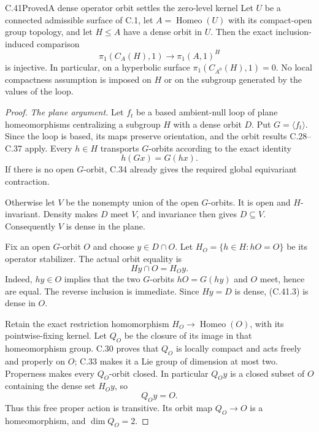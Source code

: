 \begin{claim}{C.41}{Proved}{A dense operator orbit settles the zero-level kernel}
Let $U$ be a connected admissible surface of C.1, let
$A=\operatorname{Homeo}(U)$ with its compact-open group
topology, and let $H\leq A$ have a dense orbit in $U$.
Then the exact inclusion-induced comparison
\[
 \pi_1(C_A(H),1)\longrightarrow\pi_1(A,1)^H
                                                        \tag{C.41.1}
\]
is injective. In particular, on a hyperbolic surface
$\pi_1(C_{A^0}(H),1)=0$. No local compactness assumption
is imposed on $H$ or on the subgroup generated by
the values of the loop.
\end{claim}

\begin{proof}
\emph{The plane argument.}
Let $f_t$ be a based ambient-null loop of plane
homeomorphisms centralizing a subgroup $H$ with
a dense orbit $D$. Put $G=\langle f_t\rangle$.
Since the loop is based, its maps preserve
orientation, and the orbit results C.28--C.37
apply. Every $h\in H$ transports $G$-orbits
according to the exact identity
\[
                       h(Gx)=G(hx).
                                                        \tag{C.41.2}
\]
If there is no open $G$-orbit, C.34 already
gives the required global equivariant contraction.

Otherwise let $V$ be the nonempty union of the
open $G$-orbits. It is open and $H$-invariant.
Density makes $D$ meet $V$, and invariance then
gives $D\subseteq V$. Consequently $V$ is dense
in the plane.

Fix an open $G$-orbit $O$ and choose $y\in D\cap O$.
Let $H_O=\{h\in H:hO=O\}$ be its operator
stabilizer. The actual orbit equality is
\[
                     H y\cap O=H_O y.
                                                        \tag{C.41.3}
\]
Indeed, $hy\in O$ implies that the two $G$-orbits
$hO=G(hy)$ and $O$ meet, hence are equal. The
reverse inclusion is immediate. Since $Hy=D$
is dense, (C.41.3) is dense in $O$.

Retain the exact restriction homomorphism
$H_O\to\operatorname{Homeo}(O)$, with its
pointwise-fixing kernel. Let $Q_O$ be the
closure of its image in that homeomorphism
group. C.30 proves that $Q_O$ is locally
compact and acts freely and properly on $O$;
C.33 makes it a Lie group of dimension at
most two. Properness makes every $Q_O$-orbit
closed. In particular $Q_Oy$ is a closed
subset of $O$ containing the dense set
$H_Oy$, so
\[
                         Q_Oy=O.
                                                        \tag{C.41.4}
\]
Thus this free proper action is transitive.
Its orbit map $Q_O\to O$ is a homeomorphism,
and $\dim Q_O=2$.


\end{proof}
